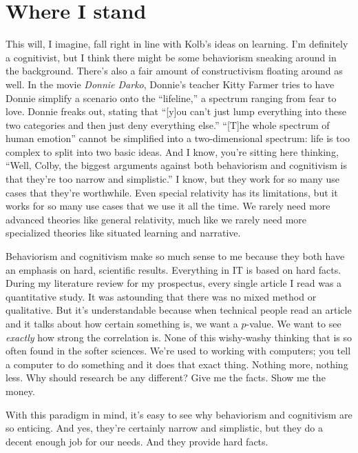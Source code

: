 \documentclass[man,natbib]{apa6}
\begin{document}
\section{Where I stand}
This will, I imagine, fall right in line with Kolb's ideas on learning. I'm definitely a cognitivist, but I think there might be some behaviorism sneaking around in the background. There's also a fair amount of constructivism floating around as well.
In the movie \textit{Donnie Darko}, Donnie's teacher Kitty Farmer tries to have Donnie simplify a scenario onto the ``lifeline,'' a spectrum ranging from fear to love. Donnie freaks out, stating that ``[y]ou can't just lump everything into these two categories and then just deny everything else.'' ``[T]he whole spectrum of human emotion'' cannot be simplified into a two-dimensional spectrum: life is too complex to split into two basic ideas.
And I know, you're sitting here thinking, ``Well, Colby, the biggest arguments against both behaviorism and cognitivism is that they're too narrow and simplistic.'' I know, but they work for so many use cases that they're worthwhile. Even special relativity has its limitations, but it works for so many use cases that we use it all the time. We rarely need more advanced theories like general relativity, much like we rarely need more specialized theories like situated learning and narrative.

Behaviorism and cognitivism make so much sense to me because they both have an emphasis on hard, scientific results. Everything in IT is based on hard facts.
During my literature review for my prospectus, every single article I read was a quantitative study. It was astounding that there was no mixed method or qualitative. But it's understandable because when technical people read an article and it talks about how certain something is, we want a $p$-value. We want to see \emph{exactly} how strong the correlation is. None of this wishy-washy thinking that is so often found in the softer sciences. We're used to working with computers; you tell a computer to do something and it does that exact thing. Nothing more, nothing less. Why should research be any different? Give me the facts. Show me the money.

With this paradigm in mind, it's easy to see why behaviorism and cognitivism are so enticing. And yes, they're certainly narrow and simplistic, but they do a decent enough job for our needs. And they provide hard facts.
\end{document}

